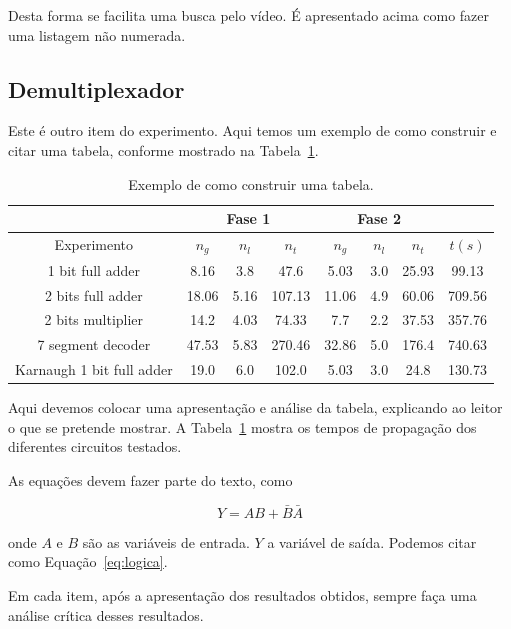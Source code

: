 \documentclass[12pt]{article}
\begin{document}
Desta forma se facilita uma busca pelo vídeo. É apresentado acima como fazer uma listagem não numerada.

\subsection{Demultiplexador}
\label{sec:Demux}

Este é outro item do experimento. Aqui temos um exemplo de como construir e citar uma tabela, conforme mostrado na Tabela~\ref{tab:resultados}.

\begin{table}[H]
    \centering
    \caption{Exemplo de como construir uma tabela.}
    \label{tab:resultados}
    \begin{tabular}{|c|c|c|c|c|c|c|c|}
    \cline{2-7}
    \multicolumn{1}{c}{} & \multicolumn{3}{|c|}{Fase 1} & \multicolumn{3}{c|}{Fase 2} & \multicolumn{1}{c}{} \\
    \hline
    Experimento & $n_g$ & $n_l$ & $n_t$ & $n_g$ & $n_l$ & $n_t$ & $t(s)$ \\
    \hline
    1 bit full adder & 8.16 & 3.8 & 47.6 & 5.03 & 3.0 & 25.93 & 99.13 \\
    2 bits full adder & 18.06 & 5.16 & 107.13 & 11.06 & 4.9 & 60.06 & 709.56 \\
    2 bits multiplier & 14.2 & 4.03 & 74.33 & 7.7 & 2.2 & 37.53 & 357.76 \\
    7 segment decoder & 47.53 & 5.83 & 270.46 & 32.86 & 5.0 & 176.4 & 740.63 \\
    Karnaugh 1 bit full adder & 19.0 & 6.0 & 102.0 & 5.03 & 3.0 & 24.8 & 130.73 \\
    \hline
    \end{tabular}

\end{table}

Aqui devemos colocar uma apresentação e análise da tabela, explicando ao leitor o que se pretende mostrar. A Tabela~\ref{tab:resultados} mostra os tempos de propagação dos diferentes circuitos testados.

As equações devem fazer parte do texto, como 

\begin{equation}
\label{eq:logica}
    Y=AB+\bar{B}\bar{A}
\end{equation}

\noindent onde $A$ e $B$ são as variáveis de entrada. $Y$ a variável de saída. Podemos citar como Equação~\ref{eq:logica}.

Em cada item, após a apresentação dos resultados obtidos, sempre faça uma análise crítica desses resultados.
\end{document}
